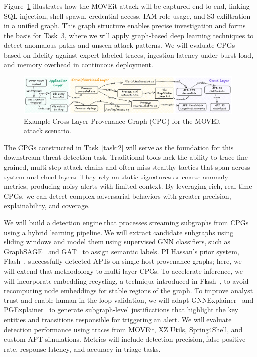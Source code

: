 Figure~\ref{fig:example:cpg} illustrates how the MOVEit attack will be captured end-to-end, linking SQL injection, shell spawn, credential access, IAM role usage, and S3 exfiltration in a unified graph. This graph structure enables precise investigation and forms the basis for Task~3, where we will apply graph-based deep learning techniques to detect anomalous paths and unseen attack patterns. We will evaluate CPGs based on fidelity against expert-labeled traces, ingestion latency under burst load, and memory overhead in continuous deployment.

\begin{figure}[t!]
    \centering \includegraphics[width=0.99\textwidth]{fig/graph-example.png}
    \caption{Example Cross-Layer Provenance Graph (CPG) for the MOVEit attack scenario.}
    \label{fig:example:cpg}
\end{figure}

 The CPGs constructed in Task~\ref{task:2} will serve as the foundation for this downstream threat detection task. Traditional tools lack the ability to trace fine-grained, multi-step attack chains and often miss stealthy tactics that span across system and cloud layers. They rely on static signatures or coarse anomaly metrics, producing noisy alerts with limited context. By leveraging rich, real-time CPGs, we can detect complex adversarial behaviors with greater precision, explainability, and coverage.

We will build a detection engine that processes streaming subgraphs from CPGs using a hybrid learning pipeline. We will extract candidate subgraphs using sliding windows and model them using supervised GNN classifiers, such as GraphSAGE~\cite{lo2022graphsage} and GAT~\cite{velivckovic2017graph} to assign semantic labels. PI Hassan’s prior system, Flash~\cite{flash2024}, successfully detected APTs on single-host provenance graphs; here, we will extend that methodology to multi-layer CPGs. To accelerate inference, we will incorporate embedding recycling, a technique introduced in Flash~\cite{flash2024}, to avoid recomputing node embeddings for stable regions of the graph. To improve analyst trust and enable human-in-the-loop validation, we will adapt GNNExplainer~\cite{ying2019gnnexplainer} and PGExplainer~\cite{luo2020parameterized} to generate subgraph-level justifications that highlight the key entities and transitions responsible for triggering an alert. We will evaluate detection performance using traces from MOVEit, XZ Utils, Spring4Shell, and custom APT simulations. Metrics will include detection precision, false positive rate, response latency, and accuracy in triage tasks.

